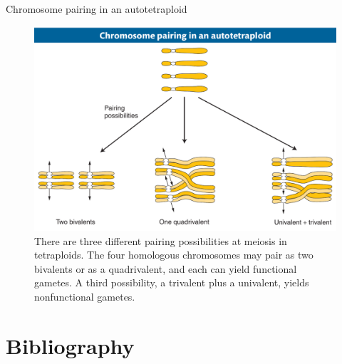 \documentclass[11pt,ignorenonframetext,aspectratio=169]{beamer}
\begin{document}
\begin{frame}{Chromosome pairing in an autotetraploid}
\protect\hypertarget{chromosome-pairing-in-an-autotetraploid}{}
\begin{figure}
\includegraphics[width=0.65\linewidth]{../images/autotetraploid_chromosome_pairing} \caption{There are three different pairing possibilities at meiosis in tetraploids. The four homologous chromosomes may pair as two bivalents or as a quadrivalent, and each can yield functional gametes. A third possibility, a trivalent plus a univalent, yields nonfunctional gametes.}\label{fig:autotetraploid-chromosome-pairing}
\end{figure}
\end{frame}

\hypertarget{bibliography}{%
\section{Bibliography}\label{bibliography}}

\begin{frame}{}
\protect\hypertarget{section-16}{}
\end{frame}
\end{document}
